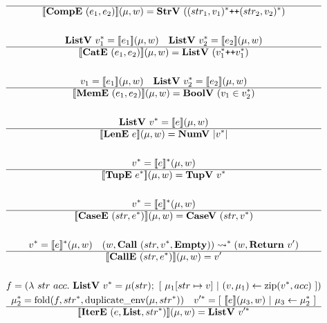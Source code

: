 \begin{gather*}
  \hline
  \sem{\compe ~ (e_1, e_2)}(\mu, w) = \strv ~ (\seq{(str_1, v_1)} \cat \seq{(str_2, v_2)}) \\
%
\newline \\
  \listv ~ \seq{v_1} = \sem{e_1}(\mu, w) \quad
  \listv ~ \seq{v_2} = \sem{e_2}(\mu, w) \\
  \hline
  \sem{\cate ~ (e_1, e_2)}(\mu, w) = \listv ~ (\seq{v_1} \cat \seq{v_1}) \\
%
\newline \\
  v_1 = \sem{e_1}(\mu, w) \quad
  \listv ~ \seq{v_2} = \sem{e_2}(\mu, w) \\
  \hline
  \sem{\meme ~ (e_1, e_2)}(\mu, w) = \boolv ~ (v_1 \in \seq{v_2}) \\
%
\newline \\
  \listv ~ \seq{v} = \sem{e}(\mu, w) \\
  \hline
  \sem{\lene ~ e}(\mu, w) = \numv ~ |\seq v| \\
%
\newline \\
  \seq{v} = \seq{\sem{e}}(\mu, w) \\
  \hline
  \sem{\tupe ~ \seq{e}}(\mu, w) = \tupv ~ \seq{v} \\
%
\newline \\
  \seq{v} = \seq{\sem{e}}(\mu, w) \\
  \hline
  \sem{\casee ~ (str, \seq{e})}(\mu, w) = \casev ~ (str, \seq{v}) \\
%
\newline \\
  \seq{v} = \seq{\sem{e}}(\mu, w) \quad
  (w, \call ~ (str, \seq v, \mt)) \seq{\leadsto} (w, \ret ~ v') \\
  \hline
  \sem{\calle ~ (str, \seq{e})}(\mu, w) = v' \\
%
\newline \\
  f =
    (\lambda ~ str ~ acc. ~
      \listv ~ \seq v = \mu(str); ~
      [ ~ \mu_1[str \mapsto v] ~ | ~ (v, \mu_1) \leftarrow \zip (\seq v, acc) ~ ]
    )
  \\
  \seq{\mu_2} = \fold(f, \seq{str}, \duplicateenv(\mu, \seq{str})) \quad
  \seq{v'} = [ ~ \sem{e}(\mu_3, w) ~ | ~ \mu_3 \leftarrow \seq {\mu_2} ~ ] \\
  \hline
  \sem{\itere ~ (e, \listiter, \seq{str})}(\mu, w) = \listv ~ \seq{v'} \\

\end{gather*}
